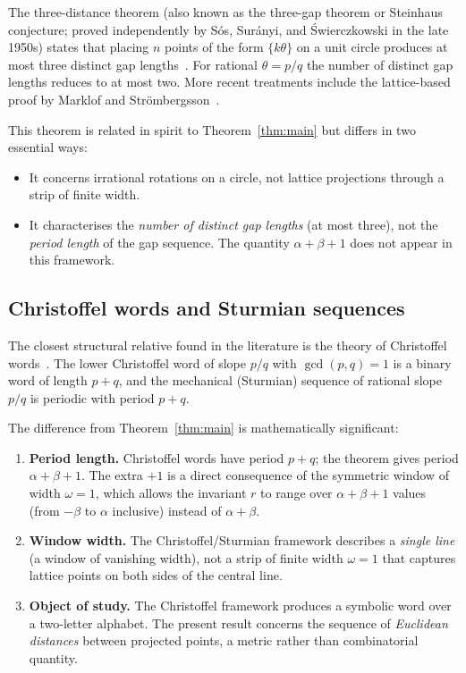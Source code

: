\documentclass[11pt]{article}
\theoremstyle{plain}
\theoremstyle{definition}
\theoremstyle{remark}
\begin{document}
The three-distance theorem (also known as the three-gap theorem or Steinhaus
conjecture; proved independently by S\'{o}s, Sur\'{a}nyi, and
\'{S}wierczkowski in the late 1950s) states that placing $n$ points of the form
$\{k\theta\}$ on a unit circle produces at most three distinct gap
lengths~\cite{ThreeGap, BertheReutenauer2024}.
For rational $\theta = p/q$ the number of distinct gap lengths reduces to at
most two.  More recent treatments include the lattice-based proof by Marklof
and Str\"{o}mbergsson~\cite{MarklofStrombergsson2017}.

This theorem is related in spirit to Theorem~\ref{thm:main} but differs in two
essential ways:
\begin{itemize}
    \item It concerns irrational rotations on a circle, not lattice projections
          through a strip of finite width.
    \item It characterises the \emph{number of distinct gap lengths} (at most
          three), not the \emph{period length} of the gap sequence.
          The quantity $\alpha + \beta + 1$ does not appear in this framework.
\end{itemize}

\subsection{Christoffel words and Sturmian sequences}

The closest structural relative found in the literature is the theory of
Christoffel words~\cite{BerstelEtAl2008}.
The lower Christoffel word of slope $p/q$ with $\gcd(p,q)=1$ is a binary word
of length $p+q$, and the mechanical (Sturmian) sequence of rational slope $p/q$
is periodic with period $p + q$.

The difference from Theorem~\ref{thm:main} is mathematically significant:

\begin{enumerate}
    \item \textbf{Period length.}
    Christoffel words have period $p + q$; the theorem gives period
    $\alpha + \beta + 1$.  The extra $+1$ is a direct consequence of the
    symmetric window of width $\omega = 1$, which allows the invariant $r$ to
    range over $\alpha + \beta + 1$ values (from $-\beta$ to $\alpha$
    inclusive) instead of $\alpha + \beta$.

    \item \textbf{Window width.}
    The Christoffel/Sturmian framework describes a \emph{single line}
    (a window of vanishing width), not a strip of finite width $\omega = 1$
    that captures lattice points on both sides of the central line.

    \item \textbf{Object of study.}
    The Christoffel framework produces a symbolic word over a two-letter
    alphabet.  The present result concerns the sequence of \emph{Euclidean
    distances} between projected points, a metric rather than combinatorial
    quantity.
\end{enumerate}
\end{document}
